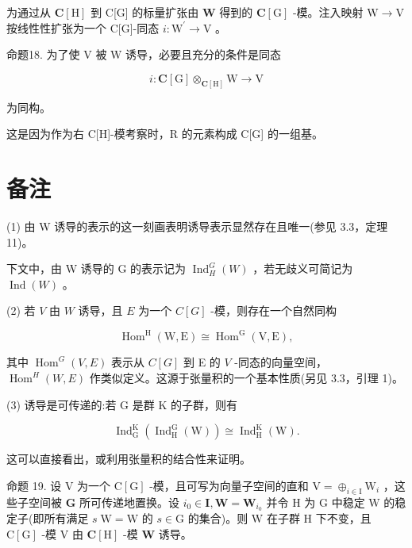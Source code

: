 \documentclass[10pt]{article}
\begin{document}
为通过从 \(\mathbf{C}\left\lbrack  \mathrm{H}\right\rbrack\) 到 C[G] 的标量扩张由 \(\mathbf{W}\) 得到的 \(\mathbf{C}\left\lbrack  \mathrm{G}\right\rbrack\) -模。注入映射 \(\mathrm{W} \rightarrow  \mathrm{V}\) 按线性性扩张为一个 C[G]-同态 \(i : {\mathrm{W}}^{\prime } \rightarrow  \mathrm{V}\) 。

命题18. 为了使 \(\mathrm{V}\) 被 \(\mathrm{W}\) 诱导，必要且充分的条件是同态

\[
i : \mathbf{C}\left\lbrack  \mathrm{G}\right\rbrack  { \otimes  }_{\mathbf{C}\left\lbrack  \mathrm{H}\right\rbrack  }\mathrm{W} \rightarrow  \mathrm{V}
\]

为同构。

这是因为作为右 C[H]-模考察时，R 的元素构成 C[G] 的一组基。

\section*{备注}

(1) 由 W 诱导的表示的这一刻画表明诱导表示显然存在且唯一(参见 3.3，定理 11)。

下文中，由 W 诱导的 G 的表示记为 \({\operatorname{Ind}}_{H}^{G}\left( W\right)\) ，若无歧义可简记为 \(\operatorname{Ind}\left( W\right)\) 。

(2) 若 \(V\) 由 \(W\) 诱导，且 \(E\) 为一个 \(C\left\lbrack  G\right\rbrack\) -模，则存在一个自然同构

\[
{\operatorname{Hom}}^{\mathrm{H}}\left( {\mathrm{W},\mathrm{E}}\right)  \cong  {\operatorname{Hom}}^{\mathrm{G}}\left( {\mathrm{V},\mathrm{E}}\right) ,
\]

其中 \({\operatorname{Hom}}^{G}\left( {V,E}\right)\) 表示从 \(C\left\lbrack  G\right\rbrack\) 到 E 的 \(V\) -同态的向量空间， \({\operatorname{Hom}}^{H}\left( {W,E}\right)\) 作类似定义。这源于张量积的一个基本性质(另见 3.3，引理 1)。

(3) 诱导是可传递的:若 \(\mathrm{G}\) 是群 \(\mathrm{K}\) 的子群，则有

\[
{\operatorname{Ind}}_{\mathrm{G}}^{\mathrm{K}}\left( {{\operatorname{Ind}}_{\mathrm{H}}^{\mathrm{G}}\left( \mathrm{W}\right) }\right)  \cong  {\operatorname{Ind}}_{\mathrm{H}}^{\mathrm{K}}\left( \mathrm{W}\right) .
\]

这可以直接看出，或利用张量积的结合性来证明。

命题 19. 设 \(\mathrm{V}\) 为一个 \(\mathrm{C}\left\lbrack  \mathrm{G}\right\rbrack\) -模，且可写为向量子空间的直和 \(\mathrm{V} = { \oplus  }_{i \in  \mathrm{I}}{\mathrm{W}}_{i}\) ，这些子空间被 \(\mathbf{G}\) 所可传递地置换。设 \({i}_{0} \in  \mathbf{I},\mathbf{W} = {\mathbf{W}}_{{i}_{0}}\) 并令 \(\mathrm{H}\) 为 \(\mathrm{G}\) 中稳定 \(\mathrm{W}\) 的稳定子(即所有满足 \(s\mathrm{\;W} = \mathrm{W}\) 的 \(s \in  \mathrm{G}\) 的集合)。则 \(\mathrm{W}\) 在子群 \(\mathrm{H}\) 下不变，且 \(\mathrm{C}\left\lbrack  \mathrm{G}\right\rbrack\) -模 \(\mathrm{V}\) 由 \(\mathbf{C}\left\lbrack  \mathrm{H}\right\rbrack\) -模 \(\mathbf{W}\) 诱导。
\end{document}
